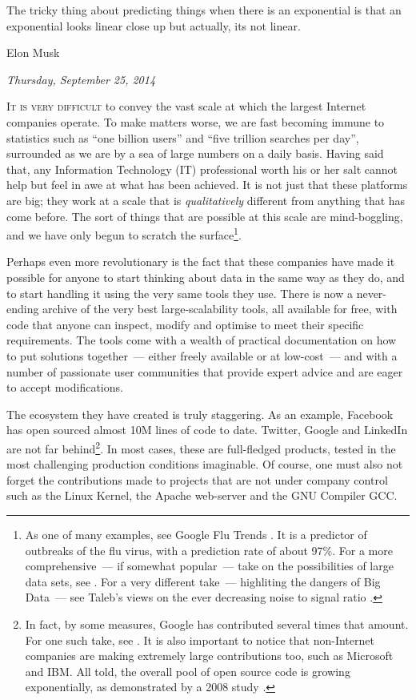 \documentclass{book}
\begin{document}
\epigraph{The tricky thing about predicting things when there is an
  exponential is that an exponential looks linear close up but
  actually, its not linear.}{Elon Musk}

\begin{flushright}
  \emph{Thursday, September 25, 2014}
\end{flushright}

\lettrine{I}{t is very difficult} to convey the vast scale at which
the largest Internet companies operate. To make matters worse, we are
fast becoming immune to statistics such as ``one billion
users''\cite{Mashable01} and ``five trillion searches per
day''\cite{StatisticsBrain01}, surrounded as we are by a sea of large
numbers on a daily basis. Having said that, any Information Technology
(IT) professional worth his or her salt cannot help but feel in awe at
what has been achieved. It is not just that these platforms are big;
they work at a scale that is \emph{qualitatively} different from
anything that has come before. The sort of things that are possible at
this scale are mind-boggling, and we have only begun to scratch the
surface\footnote{As one of many examples, see Google Flu Trends
  \cite{Wikipedia02}. It is a predictor of outbreaks of the flu virus,
  with a prediction rate of about 97\%. For a more comprehensive~---
  if somewhat popular~--- take on the possibilities of large data
  sets, see \cite{Cukier01}. For a very different take~--- highliting
  the dangers of Big Data~--- see Taleb's views on the ever decreasing
  noise to signal ratio \cite{Taleb01}.}.

Perhaps even more revolutionary is the fact that these companies have
made it possible for anyone to start thinking about data in the same
way as they do, and to start handling it using the very same tools
they use. There is now a never-ending archive of the very best
large-scalability tools, all available for free, with code that anyone
can inspect, modify and optimise to meet their specific
requirements. The tools come with a wealth of practical documentation
on how to put solutions together~--- either freely available or at
low-cost~--- and with a number of passionate user communities that
provide expert advice and are eager to accept modifications.

The ecosystem they have created is truly staggering. As an example,
Facebook has open sourced almost 10M lines of code to
date\cite{Facebook01}. Twitter, Google and LinkedIn are not far
behind\footnote{In fact, by some measures, Google has contributed
  several times that amount. For one such take, see
  \cite{Orsini01}. It is also important to notice that non-Internet
  companies are making extremely large contributions too, such as
  Microsoft and IBM. All told, the overall pool of open source code is
  growing exponentially, as demonstrated by a 2008 study
  \cite{DeshpandeRiehle01}.}. In most cases, these are full-fledged
products, tested in the most challenging production conditions
imaginable. Of course, one must also not forget the contributions made
to projects that are not under company control such as the Linux
Kernel, the Apache web-server and the GNU Compiler GCC.
\end{document}
